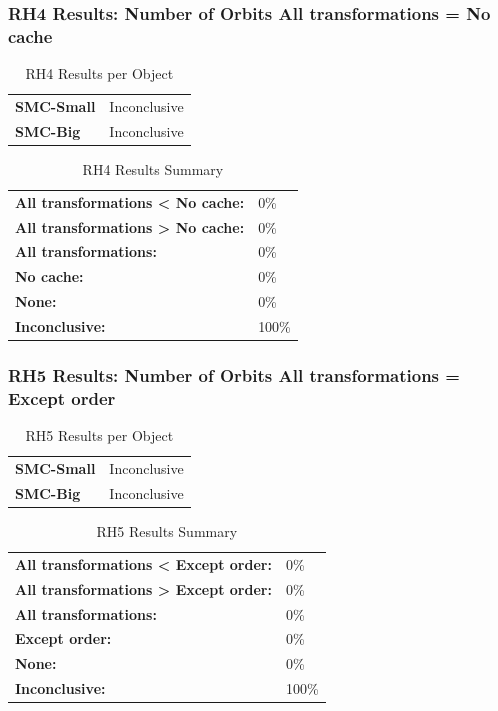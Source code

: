 \documentclass{article}\usepackage[]{graphicx}\usepackage[]{color}
\begin{document}
	
	

	
	\subsubsection{RH4 Results: Number of Orbits All transformations = No cache}
	
	
	\begin{table}[H]
	\centering
	\caption{RH4 Results per Object}
	\begin{tabular}{ll}
	\textbf{SMC-Small} & Inconclusive \\
	\textbf{SMC-Big} & Inconclusive \\
	\end{tabular}
	\end{table}

	\begin{table}[H]
	\centering
	\caption{RH4 Results Summary}
	\begin{tabular}{ll}
	\textbf{All transformations \textless{} No cache:}& 0\% \\
	\textbf{All transformations \textgreater{} No cache:}& 0\%\\
	\textbf{All transformations:} & 0\%\\
	\textbf{No cache:} & 0\%\\
	\textbf{None:}& 0\%\\
	\textbf{Inconclusive:}& 100\%
			
	
	\end{tabular}
	\end{table}
	
	
	

	
	\subsubsection{RH5 Results: Number of Orbits All transformations = Except order}
	
	
	\begin{table}[H]
	\centering
	\caption{RH5 Results per Object}
	\begin{tabular}{ll}
	\textbf{SMC-Small} & Inconclusive \\
	\textbf{SMC-Big} & Inconclusive \\
	\end{tabular}
	\end{table}

	\begin{table}[H]
	\centering
	\caption{RH5 Results Summary}
	\begin{tabular}{ll}
	\textbf{All transformations \textless{} Except order:}& 0\% \\
	\textbf{All transformations \textgreater{} Except order:}& 0\%\\
	\textbf{All transformations:} & 0\%\\
	\textbf{Except order:} & 0\%\\
	\textbf{None:}& 0\%\\
	\textbf{Inconclusive:}& 100\%
			
	
	\end{tabular}
	\end{table}
	
\end{document}
